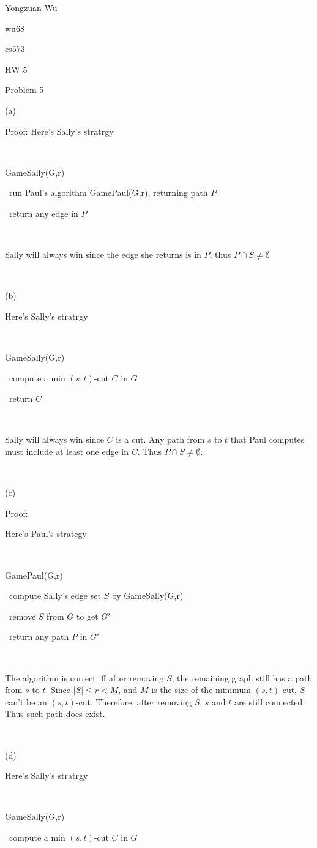 \documentclass[a4paper,12pt]{article}
\begin{document}
Yongzuan Wu

wu68

cs573

HW 5

Problem 5

(a)

Proof: Here's Sally's stratrgy

\

GameSally(G,r)

\ run Paul's algorithm GamePaul(G,r), returning path $P$

\ return any edge in $P$

\

Sally will always win since the edge she returns is in $P$, thus $P\cap S\neq \emptyset$

\

(b)

Here's Sally's stratrgy

\

GameSally(G,r)

\ compute a min $(s,t)$-cut $C$ in $G$

\ return $C$

\

Sally will always win since $C$ is a cut. Any path from $s$ to $t$ that Paul computes must include at least one edge in $C$. Thus $P\cap S\neq \emptyset$.

\

(c)

Proof:

Here's Paul's strategy

\

GamePaul(G,r)

\ compute Sally's edge set $S$ by GameSally(G,r)

\ remove $S$ from $G$ to get $G'$

\ return any path $P$ in $G'$

\

The algorithm is correct iff after removing $S$, the remaining graph still has a path from $s$ to $t$. Since $\left|S\right|\leq r < M$, and $M$ is the size of the minimum $(s,t)$-cut, $S$ can't be an $(s,t)$-cut. Therefore, after removing $S$, $s$ and $t$ are still connected. Thus such path does exist.

\

(d)

Here's Sally's stratrgy

\

GameSally(G,r)

\ compute a min $(s,t)$-cut $C$ in $G$
\end{document}
